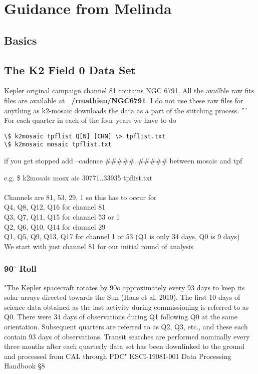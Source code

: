 \section*{Guidance from Melinda}
\subsection*{Basics}

\subsection*{The K2 Field 0 Data Set}
Kepler original campaign channel 81 contains NGC 6791. All the availble raw fits files are available at \textbf{~/rmathieu/NGC6791}. I do not use these raw files for anything as k2-mosaic downloads the data as a part of the stitching process. 
'''
For each quarter in each of the four years we have to do 

\begin{verbatim}
\$ k2mosaic tpflist Q[N] [CHN] \> tpflist.txt
\$ k2mosaic mosaic tpflist.txt 
\end{verbatim}

if you get stopped add --cadence #####..##### between mosaic and tpf 


e.g. \$ k2mosaic mosx   aic 30771..33935 tpflist.txt 
\\ \\
Channels are 81, 53, 29, 1 so this has to occur for \\
Q4, Q8, Q12, Q16 for channel 81 \\
Q3, Q7, Q11, Q15 for channel 53 or 1 \\
Q2, Q6, Q10, Q14 for channel 29 \\ 
Q1, Q5, Q9,  Q13, Q17 for channel 1 or 53 (Q1 is only 34 days, Q0 is 9 days) \\

We start with just channel 81 for our initial round of analysis 

\subsubsection{90$^\circ$ Roll}
"The Kepler spacecraft rotates by 90o approximately every 93 days to keep its solar arrays directed towards the Sun (Haas et al. 2010). The first 10 days of science data obtained as the last activity during commissioning is referred to as Q0. There were 34 days of observations during Q1 following Q0 at the same orientation. Subsequent quarters are referred to as Q2, Q3, etc., and these each contain 93 days of observations. Transit searches are performed nominally every three months after each quarterly data set has been downlinked to the ground and processed from CAL through PDC" KSCI-19081-001 Data Processing Handbook \S8


